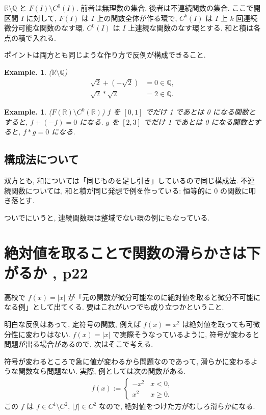 \documentclass[openany, a4paper, oneside]{book}
\theoremstyle{break}
\theoremstyle{breakdefn}
\newtheorem{ex}[thm]{Example.}
\newcommand{\rbk}[1]{\left (#1\right)}
\begin{document}
$\mathbb{R} \setminus \mathbb{Q}$ と $F (I) \setminus C^0 (I)$.
前者は無理数の集合, 後者は不連続関数の集合.
ここで開区間 $I$ に対して, $F (I)$ は $I$ 上の関数全体が作る環で,
$C^k (I)$ は $I$ 上 $k$ 回連続微分可能な関数のなす環.
$C^0 (I)$ は $I$ 上連続な関数のなす環とする.
和と積は各点の積で入れる.

ポイントは両方とも同じような作り方で反例が構成できること.
\begin{ex}\textup{($\mathbb{R} \setminus \mathbb{Q}$)}
 \begin{align}
  \sqrt{2} + \rbk{- \sqrt{2}} &= 0 \in \mathbb{Q}, \\
  \sqrt{2} * \sqrt{2} &= 2 \in \mathbb{Q}.
 \end{align}
\end{ex}
\begin{ex}\textup{($F (\mathbb{R}) \setminus C^0 (\mathbb{R})$)}
$f$ を $[0,1]$ でだけ 1 であとは 0 になる関数とすると, $f + (-f) = 0$ になる.
$g$ を $[2,3]$ でだけ 1 であとは 0 になる関数とすると, $f * g = 0$ になる.
\end{ex}
\subsection{構成法について}
\label{sec-11-3-4-1}

双方とも, 和については「同じものを足し引き」しているので同じ構成法.
不連続関数については, 和と積が同じ発想で例を作っている: 恒等的に 0 の関数に叩き落とす.

ついでにいうと, 連続関数環は整域でない環の例にもなっている.
\section{絶対値を取ることで関数の滑らかさは下がるか \cite{GelbaumOlmsted1}, p22}
\label{sec-11-3-5}

高校で $f (x) = |x|$ が「元の関数が微分可能なのに絶対値を取ると微分不可能になる例」として出てくる.
要はこれがいつでも成り立つかということ.

明白な反例はあって, 定符号の関数, 例えば $f (x) = x^2$ は絶対値を取っても可微分性に変わりはない.
$f (x) = |x|$ で実際そうなっているように, 符号が変わると問題が出る場合があるので, 次はそこで考える.

符号が変わるところで急に値が変わるから問題なのであって, 滑らかに変わるような関数なら問題ない.
実際, 例としては次の関数がある.
\begin{align}
 f (x)
 :=
 \begin{cases}
  -x^2 & x < 0, \\
  x^2   & x \geq 0.
 \end{cases}
\end{align}
この $f$ は $f \in C^1 \setminus C^2$, $|f| \in C^2$ なので, 絶対値をつけた方がむしろ滑らかになる.
\end{document}
